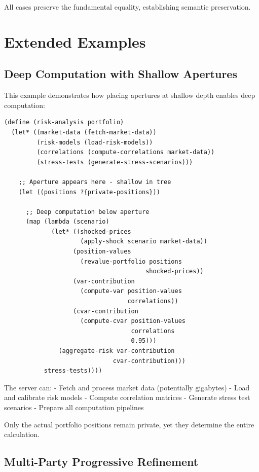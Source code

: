 \documentclass[12pt]{article}
\begin{document}
All cases preserve the fundamental equality, establishing semantic preservation.

\section{Extended Examples}

\subsection{Deep Computation with Shallow Apertures}

This example demonstrates how placing apertures at shallow depth enables deep computation:

\begin{lstlisting}
(define (risk-analysis portfolio)
  (let* ((market-data (fetch-market-data))
         (risk-models (load-risk-models))
         (correlations (compute-correlations market-data))
         (stress-tests (generate-stress-scenarios)))
    
    ;; Aperture appears here - shallow in tree
    (let ((positions ?{private-positions}))
      
      ;; Deep computation below aperture
      (map (lambda (scenario)
             (let* ((shocked-prices 
                     (apply-shock scenario market-data))
                   (position-values 
                     (revalue-portfolio positions 
                                       shocked-prices))
                   (var-contribution 
                     (compute-var position-values 
                                  correlations))
                   (cvar-contribution 
                     (compute-cvar position-values 
                                   correlations 
                                   0.95)))
               (aggregate-risk var-contribution 
                              cvar-contribution)))
           stress-tests))))
\end{lstlisting}

The server can:
- Fetch and process market data (potentially gigabytes)
- Load and calibrate risk models
- Compute correlation matrices
- Generate stress test scenarios
- Prepare all computation pipelines

Only the actual portfolio positions remain private, yet they determine the entire calculation.

\subsection{Multi-Party Progressive Refinement}
\end{document}
